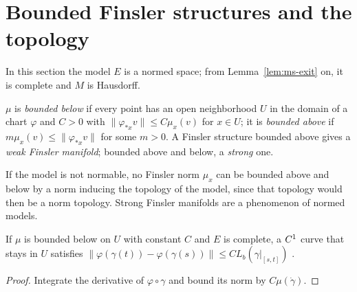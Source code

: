 \section{Bounded Finsler structures and the topology}
\label{sec:ms-bounded}

In this section the model $E$ is a normed space; from Lemma~\ref{lem:ms-exit} on, it is complete
and $M$ is Hausdorff.

\begin{definition}
  \label{def:ms-bounded}
  \leanok
  $\mu$ is \emph{bounded below} if every point has an open neighborhood $U$ in the domain of a
  chart $\varphi$ and $C > 0$ with $\|\varphi_{*x} v\| \leq C \mu_x(v)$ for $x \in U$; it is
  \emph{bounded above} if $m \mu_x(v) \leq \|\varphi_{*x} v\|$ for some $m > 0$. A Finsler
  structure bounded above gives a \emph{weak Finsler manifold}; bounded above and below, a
  \emph{strong} one.
\end{definition}

\begin{remark}
  If the model is not normable, no Finsler norm $\mu_x$ can be bounded above and below by a norm
  inducing the topology of the model, since that topology would then be a norm topology. Strong
  Finsler manifolds are a phenomenon of normed models.
\end{remark}

\begin{lemma}
  \label{lem:ms-integrated}
  \leanok
  If $\mu$ is bounded below on $U$ with constant $C$ and $E$ is complete, a $C^{1}$ curve that
  stays in $U$ satisfies $\|\varphi(\gamma(t)) - \varphi(\gamma(s))\| \leq C L_b(\gamma|_{[s, t]})$
  \cite[(9.2)]{Lar22}.
\end{lemma}

\begin{proof}
  \leanok
  Integrate the derivative of $\varphi \circ \gamma$ and bound its norm by $C \mu(\dot\gamma)$.
\end{proof}

